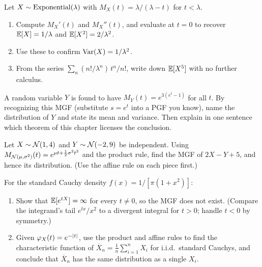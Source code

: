 \begin{exercise}
\label{ch18:ex-mgf-moments}
Let $X\sim\operatorname{Exponential}(\lambda)$ with $M_X(t)=\lambda/(\lambda-t)$ for $t<\lambda$.
\begin{enumerate}[label=(\alph*)]
  \item Compute $M_X'(t)$ and $M_X''(t)$, and evaluate at $t=0$ to recover
        $\operatorname{\mathbb{E}}[X]=1/\lambda$ and $\operatorname{\mathbb{E}}[X^2]=2/\lambda^2$.
  \item Use these to confirm $\operatorname{Var}(X)=1/\lambda^2$.
  \item From the series $\sum_n (n!/\lambda^n)\,t^n/n!$, write down $\operatorname{\mathbb{E}}[X^5]$
        with no further calculus.
\end{enumerate}
\end{exercise}

\begin{exercise}
\label{ch18:ex-identify}
A random variable $Y$ is found to have $M_Y(t)=e^{3(e^t-1)}$ for all $t$. By
recognizing this MGF (substitute $s=e^t$ into a PGF you know), name the
distribution of $Y$ and state its mean and variance. Then explain in one
sentence which theorem of this chapter licenses the conclusion.
\end{exercise}

\begin{exercise}
\label{ch18:ex-normal-sum-prob}
Let $X\sim\mathcal{N}(1,4)$ and $Y\sim\mathcal{N}(-2,9)$ be independent. Using
$M_{\mathcal{N}(\mu,\sigma^2)}(t)=e^{\mu t+\frac12\sigma^2 t^2}$ and the product
rule, find the MGF of $2X - Y + 5$, and hence its distribution. (Use the affine
rule on each piece first.)
\end{exercise}

\begin{exercise}
\label{ch18:ex-cauchy-mgf}
For the standard Cauchy density $f(x)=1/[\pi(1+x^2)]$:
\begin{enumerate}[label=(\alph*)]
  \item Show that $\operatorname{\mathbb{E}}[e^{tX}]=\infty$ for every $t\ne 0$, so the MGF does not
        exist. (Compare the integrand's tail $e^{tx}/x^2$ to a divergent
        integral for $t>0$; handle $t<0$ by symmetry.)
  \item Given $\varphi_X(t)=e^{-\lvert t\rvert}$, use the product and affine rules to
        find the characteristic function of $\overline X_n=\frac1n\sum_{i=1}^n
        X_i$ for i.i.d.\ standard Cauchys, and conclude that $\overline X_n$ has
        the same distribution as a single $X_i$.
\end{enumerate}
\end{exercise}


